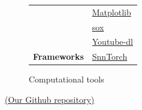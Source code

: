 \documentclass[11pt]{article}
\begin{document}
\begin{figure}[h]
\begin{center}
\begin{tabularx}{\textwidth}{|X|X|}
                          & \href{https://matplotlib.org/}{Matplotlib}                    \\
                          & \href{https://pysox.readthedocs.io/en/latest/}{sox}           \\
                          & \href{https://github.com/ytdl-org/youtube-dl}{Youtube-dl}     \\
      \hline
      \textbf{Frameworks} & \href{https://github.com/eriksoper/SnnTorch}{SnnTorch}        \\
      \hline
    \end{tabularx}
  \end{center}
  \caption{Computational tools}
\end{figure}

\href{https://github.com/LGPolytech/Project_S9}{(Our Github repository)}

\pagebreak



\end{document}
